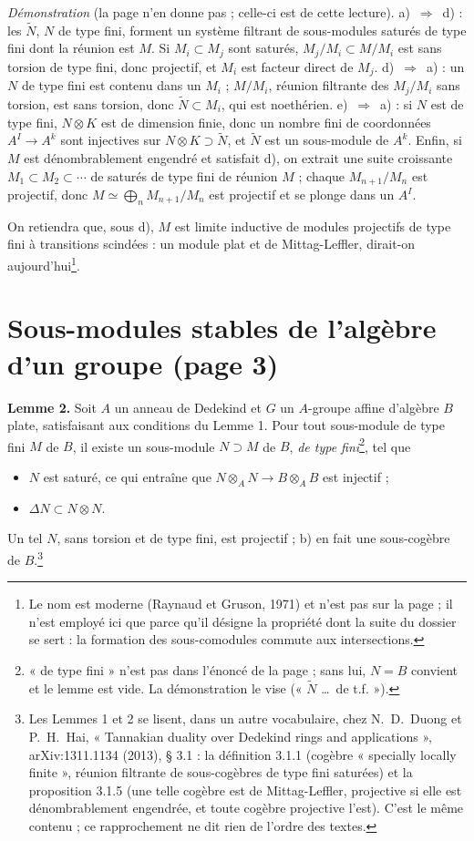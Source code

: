 \documentclass[11pt,a4paper]{article}
\begin{document}
\emph{Démonstration} (la page n'en donne pas ; celle-ci est de cette
lecture). a)~$\Rightarrow$~d) : les $\widetilde{N}$, $N$ de type fini,
forment un système filtrant de sous-modules saturés de type fini dont la
réunion est $M$. Si $M_i \subset M_j$ sont saturés, $M_j/M_i \subset M/M_i$
est sans torsion de type fini, donc projectif, et $M_i$ est facteur direct
de $M_j$. d)~$\Rightarrow$~a) : un $N$ de type fini est contenu dans un
$M_i$ ; $M/M_i$, réunion filtrante des $M_j/M_i$ sans torsion, est sans
torsion, donc $\widetilde{N} \subset M_i$, qui est noethérien.
e)~$\Rightarrow$~a) : si $N$ est de type fini, $N \otimes K$ est de
dimension finie, donc un nombre fini de coordonnées $A^{I} \to A^{k}$ sont
injectives sur $N \otimes K \supset \widetilde{N}$, et $\widetilde{N}$ est
un sous-module de $A^{k}$. Enfin, si $M$ est dénombrablement engendré et
satisfait d), on extrait une suite croissante $M_1 \subset M_2 \subset
\cdots$ de saturés de type fini de réunion $M$ ; chaque $M_{n+1}/M_n$ est
projectif, donc $M \simeq \bigoplus_n M_{n+1}/M_n$ est projectif et se
plonge dans un $A^{I}$.

On retiendra que, sous d), $M$ est limite inductive de modules projectifs
de type fini à transitions scindées : un module plat et de Mittag-Leffler,
dirait-on aujourd'hui\footnote{Le nom est moderne (Raynaud et Gruson, 1971)
et n'est pas sur la page ; il n'est employé ici que parce qu'il désigne
la propriété dont la suite du dossier se sert : la
formation des sous-comodules commute aux intersections.}.

\section*{Sous-modules stables de l'algèbre d'un groupe (page 3)}

\textbf{Lemme 2.} Soit $A$ un anneau de Dedekind et $G$ un $A$-groupe
affine d'algèbre $B$ plate, satisfaisant aux conditions du Lemme 1. Pour tout
sous-module de type fini $M$ de $B$, il existe un sous-module $N \supset M$
de $B$, \emph{de type fini}\footnote{« de type fini » n'est pas dans
l'énoncé de la page ; sans lui, $N = B$ convient et le lemme est vide. La
démonstration le vise (« $\widetilde{N}$ \ldots\ de t.f. »).}, tel que
\begin{itemize}
  \item[a)] $N$ est saturé, ce qui entraîne que $N \otimes_A N \to B
    \otimes_A B$ est injectif ;
  \item[b)] $\Delta N \subset N \otimes N$.
\end{itemize}
Un tel $N$, sans torsion et de type fini, est projectif ; b) en fait une
sous-cogèbre de $B$.\footnote{Les Lemmes 1 et 2 se lisent, dans un autre
vocabulaire, chez N.~D.~Duong et P.~H.~Hai, « Tannakian duality over Dedekind
rings and applications », arXiv:1311.1134 (2013), § 3.1 : la définition 3.1.1
(cogèbre « specially locally finite », réunion filtrante de sous-cogèbres de
type fini saturées) et la proposition 3.1.5 (une telle cogèbre est de
Mittag-Leffler, projective si elle est dénombrablement engendrée, et toute
cogèbre projective l'est). C'est le même contenu ; ce rapprochement ne dit
rien de l'ordre des textes.}
\end{document}
